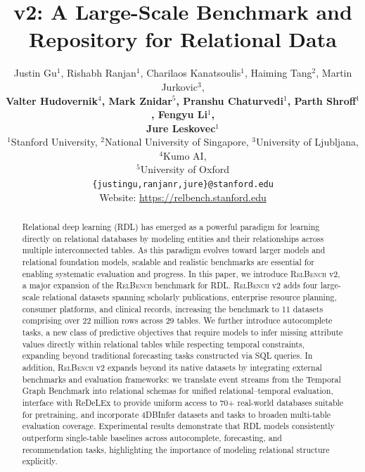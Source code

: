 \documentclass{article} %
\title{\relbench v2: A Large-Scale Benchmark and Repository for Relational Data}
\author{Justin Gu$^1$,
Rishabh Ranjan$^1$,
Charilaos Kanatsoulis$^1$,
Haiming Tang$^2$,
Martin Jurkovic$^3$,\\
\textbf{Valter Hudovernik$^4$,
Mark Znidar$^5$,
Pranshu Chaturvedi$^1$,
Parth Shroff$^1$,
Fengyu Li$^1$,}\\
\textbf{Jure Leskovec$^1$}\\
$^1$Stanford University,
$^2$National University of Singapore,
$^3$University of Ljubljana,
$^4$Kumo AI,\\
$^5$University of Oxford\\
\texttt{\{justingu,ranjanr,jure\}@stanford.edu} \\
Website: \textcolor{cyan}{\url{https://relbench.stanford.edu}}
}
\newcommand{\relbench}{\textsc{RelBench}\xspace}
\begin{document}
\maketitle

\begin{abstract}
Relational deep learning (RDL) has emerged as a powerful paradigm for learning directly on relational databases by modeling entities and their relationships across multiple interconnected tables. As this paradigm evolves toward larger models and relational foundation models, scalable and realistic benchmarks are essential for enabling systematic evaluation and progress. In this paper, we introduce \relbench v2, a major expansion of the \relbench benchmark for RDL. \relbench v2 adds four large-scale relational datasets spanning scholarly publications, enterprise resource planning, consumer platforms, and clinical records, increasing the benchmark to 11 datasets comprising over 22 million rows across 29 tables. We further introduce autocomplete tasks, a new class of predictive objectives that require models to infer missing attribute values directly within relational tables while respecting temporal constraints, expanding beyond traditional forecasting tasks constructed via SQL queries. In addition, \relbench v2 expands beyond its native datasets by integrating external benchmarks and evaluation frameworks: we translate event streams from the Temporal Graph Benchmark into relational schemas for unified relational–temporal evaluation, interface with ReDeLEx to provide uniform access to 70+ real-world databases suitable for pretraining, and incorporate 4DBInfer datasets and tasks to broaden multi-table evaluation coverage. Experimental results demonstrate that RDL models consistently outperform single-table baselines across autocomplete, forecasting, and recommendation tasks, highlighting the importance of modeling relational structure explicitly. 

\end{abstract}
\end{document}
